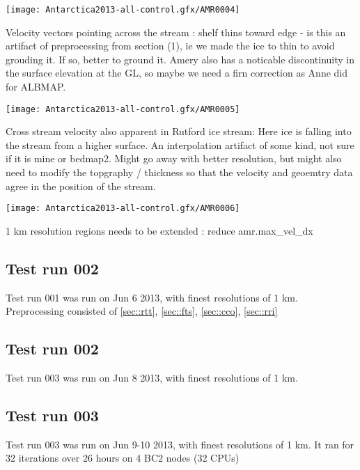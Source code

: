 \documentclass{article}
\begin{document}
\begin{center}
\texttt{[image: Antarctica2013-all-control.gfx/AMR0004]}
\end{center}

Velocity vectors pointing across the stream : shelf thins toward edge - is this an artifact
of preprocessing from section (1), ie we made the ice to thin to avoid grouding it. If
so, better to ground it. Amery also has a noticable discontinuity in the surface elevation at the
GL, so maybe we need a firn correction as Anne did for ALBMAP.

\begin{center}
\texttt{[image: Antarctica2013-all-control.gfx/AMR0005]}
\end{center}

Cross stream velocity also apparent in Rutford ice stream: Here ice is falling into
the stream from a higher surface.  An interpolation artifact of some kind, not sure if it is mine
or bedmap2. Might go away with better resolution, but might also need to modify the topgraphy / thickness 
so that the velocity and geoemtry data agree in the position of the stream. 


\begin{center}
\texttt{[image: Antarctica2013-all-control.gfx/AMR0006]}
\end{center}

1 km resolution regions needs to be extended : reduce amr.max\_vel\_dx 

\subsection{Test run 002}

Test run 001 was run on Jun 6 2013, with finest resolutions of  1 km.
Preprocessing consisted of \ref{sec::rtt}, \ref{sec::fts}, \ref{sec::cco}, \ref{sec::rri}

\subsection{Test run 002}

Test run 003 was run on Jun 8 2013, with finest resolutions of  1 km.


\subsection{Test run 003}

Test run 003 was run on Jun 9-10 2013, with finest resolutions of  1 km. It ran for 32
iterations over 26 hours on 4 BC2 nodes (32 CPUs)
\end{document}
